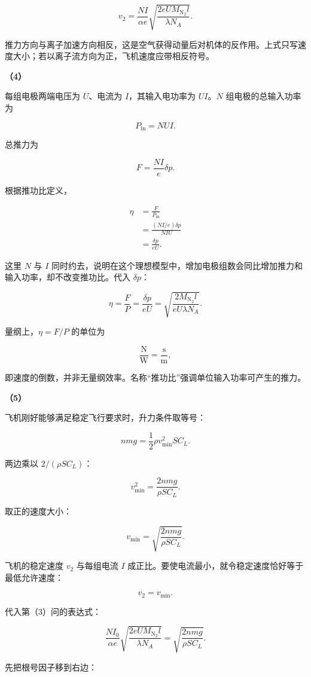 \documentclass[12pt,a4paper,UTF8]{ctexart}
\begin{document}
\[\boxed{
v_2=\frac{NI}{\alpha e}
\sqrt{\frac{2eUM_{\mathrm{N_2}}l}{\lambda N_A}}
}.\]

推力方向与离子加速方向相反，这是空气获得动量后对机体的反作用。上式只写速度大小；若以离子流方向为正，飞机速度应带相反符号。

\textbf{（4）}

每组电极两端电压为 \(U\)、电流为 \(I\)，其输入电功率为 \(UI\)。\(N\)
组电极的总输入功率为

\[P_{\mathrm{in}}=NUI.\]

总推力为

\[F=\frac{NI}{e}\delta p.\]

根据推功比定义，

\[\begin{aligned}
\eta
&=\frac{F}{P_{\mathrm{in}}}\\
&=\frac{(NI/e)\delta p}{NIU}\\
&=\frac{\delta p}{eU}.
\end{aligned}\]

这里 \(N\) 与 \(I\)
同时约去，说明在这个理想模型中，增加电极组数会同比增加推力和输入功率，却不改变推功比。代入
\(\delta p\)：

\[\eta=\frac{F}{P}
=\frac{\delta p}{eU}
=\boxed{\sqrt{\frac{2M_{\mathrm{N_2}}l}{eU\lambda N_A}}}.\]

量纲上，\(\eta=F/P\) 的单位为

\[\frac{\mathrm N}{\mathrm W}
=\frac{\mathrm s}{\mathrm m},\]

即速度的倒数，并非无量纲效率。名称``推功比''强调单位输入功率可产生的推力。

\textbf{（5）}

飞机刚好能够满足稳定飞行要求时，升力条件取等号：

\[nmg=\frac12\rho v_{\min}^2SC_L.\]

两边乘以 \(2/(\rho SC_L)\)：

\[v_{\min}^2=\frac{2nmg}{\rho SC_L}.\]

取正的速度大小：

\[v_{\min}=\sqrt{\frac{2nmg}{\rho SC_L}}.\]

飞机的稳定速度 \(v_2\) 与每组电流 \(I\)
成正比。要使电流最小，就令稳定速度恰好等于最低允许速度：

\[v_2=v_{\min}.\]

代入第（3）问的表达式：

\[\frac{NI_0}{\alpha e}
\sqrt{\frac{2eUM_{\mathrm{N_2}}l}{\lambda N_A}}
=\sqrt{\frac{2nmg}{\rho SC_L}}.\]

先把根号因子移到右边：
\end{document}
